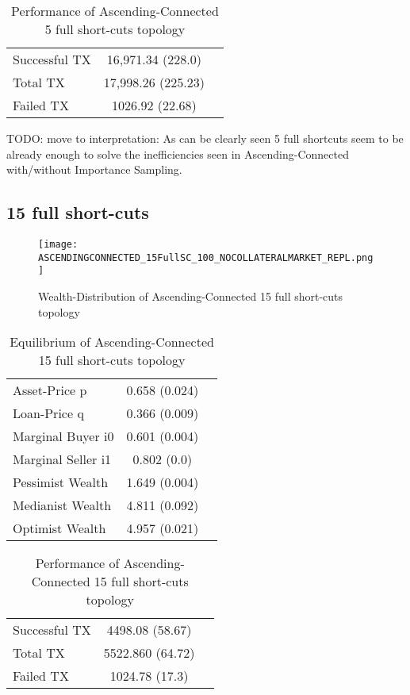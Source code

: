 \documentclass[Bachelorarbeit.tex]{subfiles}
\begin{document}
\begin{table}[H]
	\caption{Performance of Ascending-Connected 5 full short-cuts topology}
	\centering
	\begin{tabular} { l c r }
		\hline
		Successful TX & 16,971.34 (228.0) \\
		Total TX & 17,998.26 (225.23) \\
		Failed TX & 1026.92 (22.68) \\
		\hline
	\end{tabular}
\end{table}

TODO: move to interpretation: As can be clearly seen 5 full shortcuts seem to be already enough to solve the inefficiencies seen in Ascending-Connected with/without Importance Sampling.

\subsection{15 full short-cuts}
\begin{figure}[H]
	\centering
  \texttt{[image: ASCENDINGCONNECTED\_15FullSC\_100\_NOCOLLATERALMARKET\_REPL.png]}
	\caption{Wealth-Distribution of Ascending-Connected 15 full short-cuts topology}
	\label{fig:wealth_ASCENDINGCONNECTED_15FullSC_100_NOCOLLATERALMARKET_REPL}
\end{figure}

\begin{table}[H]
	\caption{Equilibrium of Ascending-Connected 15 full short-cuts topology}
	\centering
	\begin{tabular} { l c r }
		\hline
		Asset-Price p & 0.658 (0.024) \\
		Loan-Price q & 0.366 (0.009) \\
		Marginal Buyer i0 & 0.601 (0.004) \\
		Marginal Seller i1 & 0.802 (0.0) \\
		\hline
		Pessimist Wealth & 1.649 (0.004) \\
		Medianist Wealth & 4.811 (0.092) \\
		Optimist Wealth & 4.957 (0.021) \\
		\hline
	\end{tabular}
\end{table} 

\begin{table}[H]
	\caption{Performance of Ascending-Connected 15 full short-cuts topology}
	\centering
	\begin{tabular} { l c r }
		\hline
		Successful TX & 4498.08 (58.67) \\
		Total TX & 5522.860 (64.72) \\
		Failed TX & 1024.78 (17.3) \\
		\hline
	\end{tabular}
\end{table}
\end{document}
